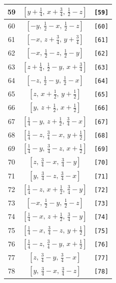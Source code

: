 \documentclass[fleqn,8pt]{jsarticle}
\begin{document}
\begin{longtable}{ccc}
59 & $\left[ y + \frac{1}{4},\, x + \frac{3}{4},\, \frac{1}{2} - z \right]$ & {\tt [59]} \\ \hline
60 & $\left[ - y,\, \frac{1}{2} - x,\, \frac{1}{2} - z \right]$ & {\tt [60]} \\ \hline
61 & $\left[ - x,\, z + \frac{3}{4},\, y + \frac{3}{4} \right]$ & {\tt [61]} \\ \hline
62 & $\left[ - x,\, \frac{1}{2} - z,\, \frac{1}{2} - y \right]$ & {\tt [62]} \\ \hline
63 & $\left[ z + \frac{1}{4},\, \frac{1}{2} - y,\, x + \frac{3}{4} \right]$ & {\tt [63]} \\ \hline
64 & $\left[ - z,\, \frac{1}{2} - y,\, \frac{1}{2} - x \right]$ & {\tt [64]} \\ \hline
65 & $\left[ z,\, x + \frac{1}{2},\, y + \frac{1}{2} \right]$ & {\tt [65]} \\ \hline
66 & $\left[ y,\, z + \frac{1}{2},\, x + \frac{1}{2} \right]$ & {\tt [66]} \\ \hline
67 & $\left[ \frac{1}{4} - y,\, z + \frac{1}{2},\, \frac{3}{4} - x \right]$ & {\tt [67]} \\ \hline
68 & $\left[ \frac{1}{4} - z,\, \frac{3}{4} - x,\, y + \frac{1}{2} \right]$ & {\tt [68]} \\ \hline
69 & $\left[ \frac{1}{4} - y,\, \frac{3}{4} - z,\, x + \frac{1}{2} \right]$ & {\tt [69]} \\ \hline
70 & $\left[ z,\, \frac{3}{4} - x,\, \frac{3}{4} - y \right]$ & {\tt [70]} \\ \hline
71 & $\left[ y,\, \frac{3}{4} - z,\, \frac{3}{4} - x \right]$ & {\tt [71]} \\ \hline
72 & $\left[ \frac{1}{4} - z,\, x + \frac{1}{2},\, \frac{3}{4} - y \right]$ & {\tt [72]} \\ \hline
73 & $\left[ - x,\, \frac{1}{2} - y,\, \frac{1}{2} - z \right]$ & {\tt [73]} \\ \hline
74 & $\left[ \frac{1}{4} - x,\, z + \frac{1}{2},\, \frac{3}{4} - y \right]$ & {\tt [74]} \\ \hline
75 & $\left[ \frac{1}{4} - x,\, \frac{3}{4} - z,\, y + \frac{1}{2} \right]$ & {\tt [75]} \\ \hline
76 & $\left[ \frac{1}{4} - z,\, \frac{3}{4} - y,\, x + \frac{1}{2} \right]$ & {\tt [76]} \\ \hline
77 & $\left[ z,\, \frac{3}{4} - y,\, \frac{3}{4} - x \right]$ & {\tt [77]} \\ \hline
78 & $\left[ y,\, \frac{3}{4} - x,\, \frac{3}{4} - z \right]$ & {\tt [78]} \\ \hline

\end{longtable}
\end{document}
